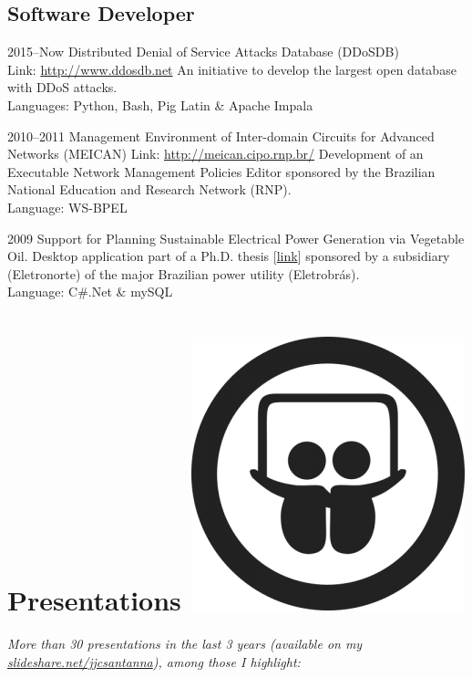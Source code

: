 \documentclass[print]{friggeri-cv} %
\begin{document}
\subsection{Software Developer}
\begin{entrylist}

\entry
{2015--Now}
{Distributed Denial of Service Attacks Database (DDoSDB)}
{\\Link: \href{http://ddosdb.net}{http://www.ddosdb.net} }
{An initiative to develop the largest open database with DDoS attacks.\\
Languages: Python, Bash, Pig Latin \& Apache Impala
}

\entry
{2010--2011}
{{Management Environment of Inter-domain Circuits for Advanced Networks (MEICAN)}}
{Link: \href{http://meican.cipo.rnp.br/}{http://meican.cipo.rnp.br/}}
{Development of an Executable Network Management Policies Editor sponsored by the Brazilian National Education and Research Network (RNP).    \\
Language: WS-BPEL
}

\entry
{2009}
{Support for Planning Sustainable Electrical Power Generation via Vegetable Oil.}
{}
{Desktop application part of a Ph.D. thesis [\href{https://sites.google.com/site/ceamazonufpa/TeseAnaRosaDuarte.pdf}{link}] sponsored by a subsidiary (Eletronorte) of the major Brazilian power utility (Eletrobrás).\\
Language: C\#.Net \& mySQL
}
\end{entrylist}

\section{ Presentations \includegraphics[scale=0.08]{img/slideshare.png}}
\emph{More than 30 presentations in the last 3 years (available on my  \href{http://www.slideshare.net/jjcsantanna}{slideshare.net/jjcsantanna}), among those I highlight:}
\end{document}

